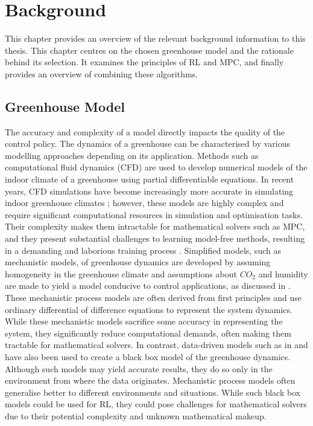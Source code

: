 \chapter{Background}
\label{chapter:Background}

This chapter provides an overview of the relevant background information to this thesis. This chapter centres on the chosen greenhouse model and the rationale behind its selection. It examines the principles of RL and MPC, and finally provides an overview of combining these algorithms. 

\section{Greenhouse Model}
\label{section:greenhouse-model}

The accuracy and complexity of a model directly impacts the quality of the control policy.  The dynamics of a greenhouse can be characterised by various modelling approaches depending on its application. Methods such as computational fluid dynamics (CFD) are used to develop numerical models of the indoor climate of a greenhouse using partial differentiable equations. In recent years, CFD simulations have become increasingly more accurate in simulating indoor greenhouse climates \cite{delatorre-geaComputationalFluidDynamics2011}; however, these models are highly complex and require significant computational resources in simulation and optimisation tasks.
Their complexity makes them intractable for mathematical solvers such as MPC, and they present substantial challenges to learning model-free methods, resulting in a demanding and laborious training process \cite{jansenOptimalControlLettuce2023}. 
Simplified models, such as mechanistic models, of greenhouse dynamics are developed by assuming homogeneity in the greenhouse climate and assumptions about $CO_2$ and humidity are made to yield a model conducive to  control applications, as discussed in \citet{jansenOptimalControlLettuce2023, lopez-cruzDevelopmentAnalysisDynamical2018}. These mechanistic process models are often derived from first principles and use ordinary differential of difference equations to represent the system dynamics. While these mechanistic models sacrifice some accuracy in representing the system, they significantly reduce computational demands, often making them tractable for mathematical solvers. 
In contrast, data-driven models such as in \citet{gongDeepLearningBased2021} and \citet{maestriniMixingProcessbasedDatadriven2022} have also been used to create a black box model of the greenhouse dynamics. Although such models may yield accurate results, they do so only in the environment from where the data originates. Mechanistic process models often generalise better to different environments and situations. While such black box models could be used for RL, they could pose challenges for mathematical solvers due to their potential complexity and unknown mathematical makeup.
